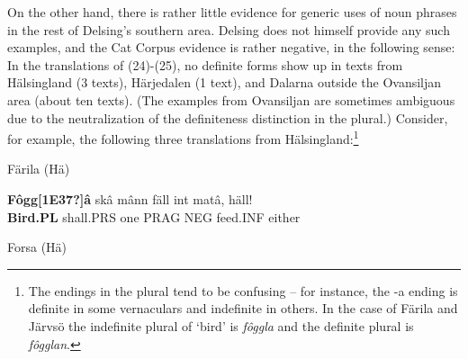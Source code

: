 \z

On the other hand, there is rather little evidence for generic uses of noun phrases in the rest of Delsing’s southern area. Delsing does not himself provide any such examples, and the Cat Corpus evidence is rather negative, in the following sense: In the translations of (24){}-(25), no definite forms show up in texts from Hälsingland (3 texts), Härjedalen (1 text), and Dalarna outside the Ovansiljan area (about ten texts). (The examples from Ovansiljan are sometimes ambiguous due to the neutralization of the definiteness distinction in the plural.) Consider, for example, the following three translations from Hälsingland:\footnote{ The endings in the plural tend to be confusing – for instance, the -a ending is definite in some vernaculars and indefinite in others. In the case of Färila and Järvsö the indefinite plural of ‘bird’ is \textit{fôggla} and the definite plural is \textit{fôgglan}. }


\item 


\item 

Färila (Hä)



 \ea\label{}
\gll \textbf{Fôgg[1E37?]â} skâ  mânn  fäll  int  matâ,  häll!\\


\textbf{Bird.PL} shall.PRS  one  PRAG  NEG  feed.INF  either\\

\item 

Forsa (Hä)


